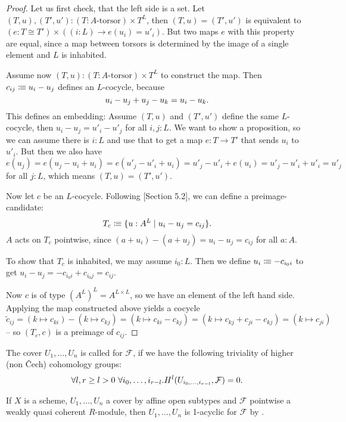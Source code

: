 \begin{proof}
  Let us first check, that the left side is a set.
  Let $(T,u),(T',u'):(T:\text{$A$-torsor})\times T^L$,
  then $(T,u)=(T',u')$ is equivalent to $(e:T\cong T')\times ((i:L)\to e(u_i)=u'_i)$.
  But two maps $e$ with this property are equal,
  since a map between torsors is determined by the image of a single element and $L$ is inhabited.
  
  Assume now $(T,u):(T:\text{$A$-torsor})\times T^L$ to construct the map.
  Then $c_{ij}\vcentcolon\mspace{-1.2mu}\equiv u_i-u_j$ defines an $L$-cocycle,
  because
  \[
    u_i-u_j + u_j-u_k = u_i-u_k
    \rlap{.}
  \]
  This defines an embedding: Assume $(T,u)$ and $(T',u')$ define the same $L$-cocycle,
  then $u_i-u_j=u'_i-u'_j$ for all $i,j:L$.
  We want to show a proposition, so we can assume there is $i:L$ and use that to get a map $e:T\to T'$
  that sends $u_i$ to $u'_i$.
  But then we also have
  \[
    e(u_j)=e(u_j-u_i+u_i)=e(u'_j-u'_i+u_i)=u'_j-u'_i+e(u_i)=u'_j-u'_i+u'_i=u'_j
  \]
  for all $j:L$, which means $(T,u)=(T',u')$.
    
  Now let $c$ be an $L$-cocycle.
  Following \cite{Deligne91}[Section 5.2], we can define a preimage-candidate:
  \[
    T_c\colonequiv \{u:A^L\mid u_i-u_j=c_{ij}\}
    \rlap{.}
  \]
  $A$ acts on $T_c$ pointwise, since $(a+u_i)-(a+u_j)=u_i-u_j=c_{ij}$ for all $a:A$.
  
  To show that $T_c$ is inhabited,
  we may assume $i_0:L$.
  Then we define $u_i\vcentcolon\mspace{-1.2mu}\equiv -c_{i_0i}$ to get $u_i-u_j=-c_{i_0i}+c_{i_0j}=c_{ij}$.

  Now $c$ is of type $(A^L)^L=A^{L\times L}$, so we have an element of the left hand side.
  Applying the map constructed above yields a cocycle
  \[
    \tilde{c}_{ij}=(k\mapsto c_{ki})-(k\mapsto c_{kj})=(k\mapsto c_{ki}-c_{kj})=(k\mapsto c_{kj}+c_{ji}-c_{kj})=(k\mapsto c_{ji})
  \]
  -- so $(T_c,c)$ is a preimage of $c_{ij}$.
\end{proof}

\begin{definition}
  The cover $U_1,\dots,U_n$ is called  for $\mathcal F$,
  if we have the following triviality of higher (non Čech) cohomology groups:
  \[
    \forall l, r\geq l>0\ \forall i_0,\dots,i_{r-l}. H^l(U_{i_0,\dots,i_{r-l}},\mathcal F)=0\rlap{.}
  \]
\end{definition}

\begin{example}
  If $X$ is a scheme, $U_1,\dots,U_n$ a cover by affine open subtypes
  and $\mathcal F$ pointwise a weakly quasi coherent $R$-module,
  then $U_1,\dots,U_n$ is 1-acyclic for $\mathcal F$ by .
\end{example}

